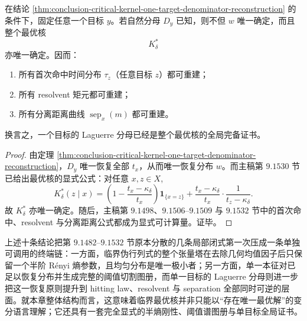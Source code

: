 \begin{corollary}[单目标分母决定整个最优核]\label{cor:conclusion-critical-kernel-one-target-denominator-complete-certificate}
在结论 \ref{thm:conclusion-critical-kernel-one-target-denominator-reconstruction} 的条件下，固定任意一个目标 \(y\)。若自然分母 \(D_y\) 已知，则不但 \(w\) 唯一确定，而且整个最优核
\[
K_\delta^\ast
\]
亦唯一确定。因而：
\begin{enumerate}
  \item 所有首次命中时间分布 \(\tau_z\)（任意目标 \(z\)）都可重建；
  \item 所有 resolvent 矩元都可重建；
  \item 所有分离距离曲线 \(\operatorname{sep}_x(m)\) 都可重建。
\end{enumerate}
换言之，一个目标的 Laguerre 分母已经是整个最优核的全局完备证书。
\end{corollary}
\begin{proof}
由定理 \ref{thm:conclusion-critical-kernel-one-target-denominator-reconstruction}，\(D_y\) 唯一恢复全部 \(t_x\)，从而唯一恢复分布 \(w\)。而主稿第 \(9.1530\) 节已给出最优核的显式公式：对任意 \(x,z\in X\),
\[
K_\delta^\ast(z\mid x)
=
\left(1-\frac{t_x-\kappa_\delta}{t_x}\right)\mathbf 1_{\{x=z\}}
+
\frac{t_x-\kappa_\delta}{t_x}\cdot \frac{1}{t_z-\kappa_\delta}.
\]
故 \(K_\delta^\ast\) 亦唯一确定。随后，主稿第 \(9.1498\)、\(9.1506\)--\(9.1509\) 与 \(9.1532\) 节中的首次命中、resolvent 与分离距离公式都成为显式可计算量。证毕。
\end{proof}

上述十条结论把第 \(9.1482\)--\(9.1532\) 节原本分散的几条局部闭式第一次压成一条单独可调用的终端链：一方面，临界伪行列式的整个张量塔在去除几何均值因子后只保留一个半阶 Rényi 熵参数，且均匀分布是唯一极小者；另一方面，单一本征对已足以恢复分布并生成完整的阈值切割图册，而单一目标的 Laguerre 分母则进一步把这一恢复原则提升到 hitting law、resolvent 与 separation 全部同时可逆的层面。就本章整体结构而言，这意味着临界最优核并非只能以“存在唯一最优解”的变分语言理解；它还具有一套完全显式的半熵刚性、阈值谱图册与单目标全局证书。

\endinput
